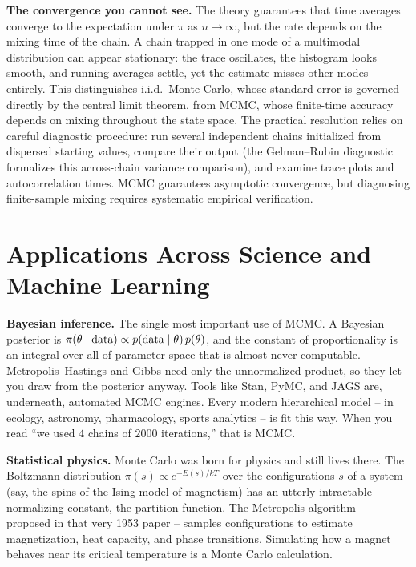\begin{paradoxbox}
\textbf{The convergence you cannot see.}
The theory guarantees that time averages converge to the expectation under $\pi$
as $n \to \infty$, but the rate depends on the mixing time of the chain.
A chain trapped in one mode of a multimodal distribution can appear stationary:
the trace oscillates, the histogram looks smooth, and running averages settle, yet
the estimate misses other modes entirely. This distinguishes i.i.d.\ Monte Carlo,
whose standard error is governed directly by the central limit theorem, from MCMC,
whose finite-time accuracy depends on mixing throughout the state space.
The practical resolution relies on careful diagnostic procedure: run several
independent chains initialized from dispersed starting values, compare their output
(the Gelman--Rubin diagnostic formalizes this across-chain variance comparison),
and examine trace plots and autocorrelation times. MCMC guarantees asymptotic convergence,
but diagnosing finite-sample mixing requires systematic empirical verification.
\end{paradoxbox}

\section{Applications Across Science and Machine Learning}
\label{ch35:applications}

\begin{applicationbox}
\textbf{Bayesian inference.} The single most important use of MCMC. A Bayesian
posterior is
$\pi(\theta \mid \text{data}) \propto p(\text{data}\mid\theta)\,p(\theta)$,
and the constant of proportionality is an integral over all of parameter space
that is almost never computable. Metropolis--Hastings and Gibbs need only the
unnormalized product, so they let you draw from the posterior anyway. Tools like
Stan, PyMC, and JAGS are, underneath, automated MCMC engines. Every modern
hierarchical model -- in ecology, astronomy, pharmacology, sports analytics -- is
fit this way. When you read ``we used $4$ chains of $2000$ iterations,'' that is
MCMC.
\end{applicationbox}

\begin{applicationbox}
\textbf{Statistical physics.} Monte Carlo was born for physics and still lives
there. The Boltzmann distribution $\pi(s) \propto e^{-E(s)/kT}$ over the
configurations $s$ of a system (say, the spins of the Ising model of magnetism)
has an utterly intractable normalizing constant, the partition function. The
Metropolis algorithm -- proposed in that very 1953 paper -- samples
configurations to estimate magnetization, heat capacity, and phase transitions.
Simulating how a magnet behaves near its critical temperature is a Monte Carlo
calculation.
\end{applicationbox}

